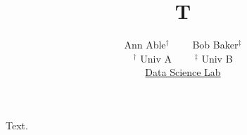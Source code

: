 \documentclass{article}
\title{T}
\author{Ann Able$^{\dagger}$ \ \ \ \ Bob Baker$^{\ddagger}$ \\ $^\dagger$ Univ A \ \ \ \ $^\ddagger$ Univ B \\ \href{https://www.ds.org}{Data Science Lab}}
\begin{document}
\maketitle
Text.
\end{document}
